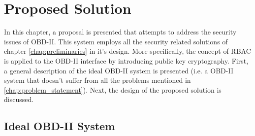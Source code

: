 \chapter{Proposed Solution}
\label{chap:solution}

In this chapter, a proposal is presented that attempts to address the security issues of OBD-II. This system employs all the security related solutions of chapter \ref{chap:preliminaries} in it's design. More specifically, the concept of RBAC is applied to the OBD-II interface by introducing public key cryptography. First, a general description of the ideal OBD-II system is presented (i.e. a OBD-II system that doesn't suffer from all the problems mentioned in \ref{chap:problem_statement}). Next, the design of the proposed solution is discussed.

\section{Ideal OBD-II System}
\label{sec:sol_RBAC}

